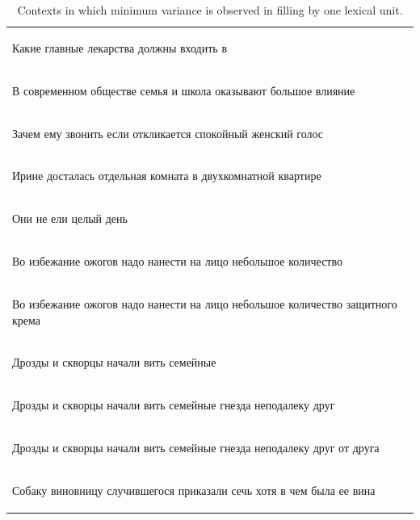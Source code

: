 \documentclass[a4paper]{article}
\begin{document}
\begin{table}
\label{tbl:min-var}
\caption{Contexts in which minimum variance is observed in filling by
one lexical unit.}
\centering

\vspace{0.5em}

\begin{tabular}{l}
\begin{russian} Какие главные лекарства должны входить в\end{russian} \\
\begin{russian} В современном обществе семья и школа оказывают большое влияние\end{russian} \\
\begin{russian} Зачем ему звонить если откликается спокойный женский голос\end{russian} \\
\begin{russian} Ирине досталась отдельная комната в двухкомнатной квартире\end{russian} \\
\begin{russian} Они не ели целый день\end{russian} \\
\begin{russian} Во избежание ожогов надо нанести на лицо небольшое количество\end{russian} \\
\begin{russian} Во избежание ожогов надо нанести на лицо небольшое количество защитного крема\end{russian} \\
\begin{russian} Дрозды и скворцы начали вить семейные\end{russian} \\
\begin{russian} Дрозды и скворцы начали вить семейные гнезда неподалеку друг\end{russian} \\
\begin{russian} Дрозды и скворцы начали вить семейные гнезда неподалеку друг от друга\end{russian} \\
\begin{russian} Собаку виновницу случившегося приказали сечь хотя в чем была ее вина\end{russian} \\

\end{tabular}
\end{table}
\end{document}
